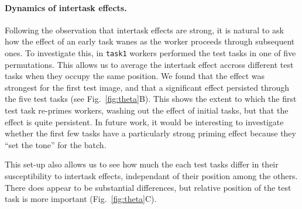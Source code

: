 \documentclass[12pt]{article}
\begin{document}
\paragraph{Dynamics of intertask effects.} Following the observation that
intertask effects are strong, it is natural to ask how the effect of an early
task wanes as the worker proceeds through subsequent ones.  To investigate
this, in \texttt{task1} workers performed the test tasks in one of five 
permutations.  This allows us to average the intertask effect accross different
test tasks when they occupy the same position.  We found that the effect was
strongest for the first test image, and that a significant effect persisted
through the five test tasks (see Fig.~\ref{fig:theta}B).  This shows the 
extent to which the first 
test task re-primes workers, washing out the effect of initial tasks, but that
the effect is quite persistent.  In future work, it would be interesting to
investigate whether the first few tasks have a particularly strong priming
effect because they ``set the tone'' for the batch.

This set-up also allows us to see how much the each test tasks differ in their 
susceptibility to intertask effects, independant of their position among the
others.  There does appear to be substantial differences, but relative
position of the test task is more important (Fig.~\ref{fig:theta}C).
\end{document}
